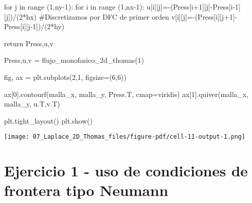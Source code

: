 \documentclass[
  letterpaper,
  DIV=11,
  numbers=noendperiod]{scrreprt}
\newenvironment{Shaded}{\begin{snugshade}}{\end{snugshade}}
\newcommand{\BuiltInTok}[1]{\textcolor[rgb]{0.00,0.23,0.31}{#1}}
\newcommand{\CommentTok}[1]{\textcolor[rgb]{0.37,0.37,0.37}{#1}}
\newcommand{\ControlFlowTok}[1]{\textcolor[rgb]{0.00,0.23,0.31}{#1}}
\newcommand{\DecValTok}[1]{\textcolor[rgb]{0.68,0.00,0.00}{#1}}
\newcommand{\KeywordTok}[1]{\textcolor[rgb]{0.00,0.23,0.31}{#1}}
\newcommand{\NormalTok}[1]{\textcolor[rgb]{0.00,0.23,0.31}{#1}}
\newcommand{\OperatorTok}[1]{\textcolor[rgb]{0.37,0.37,0.37}{#1}}
\newcommand{\StringTok}[1]{\textcolor[rgb]{0.13,0.47,0.30}{#1}}
\begin{document}
\begin{Shaded}
\begin{Highlighting}[]
    \ControlFlowTok{for}\NormalTok{ j }\KeywordTok{in} \BuiltInTok{range}\NormalTok{ (}\DecValTok{1}\NormalTok{,ny}\OperatorTok{{-}}\DecValTok{1}\NormalTok{):}
        \ControlFlowTok{for}\NormalTok{ i }\KeywordTok{in} \BuiltInTok{range}\NormalTok{ (}\DecValTok{1}\NormalTok{,nx}\OperatorTok{{-}}\DecValTok{1}\NormalTok{):}
\NormalTok{            u[i][j]}\OperatorTok{={-}}\NormalTok{(Press[i}\OperatorTok{+}\DecValTok{1}\NormalTok{][j]}\OperatorTok{{-}}\NormalTok{Press[i}\OperatorTok{{-}}\DecValTok{1}\NormalTok{][j])}\OperatorTok{/}\NormalTok{(}\DecValTok{2}\OperatorTok{*}\NormalTok{hx)  }\CommentTok{\#Discretizamos por DFC de primer orden}
\NormalTok{            v[i][j]}\OperatorTok{={-}}\NormalTok{(Press[i][j}\OperatorTok{+}\DecValTok{1}\NormalTok{]}\OperatorTok{{-}}\NormalTok{Press[i][j}\OperatorTok{{-}}\DecValTok{1}\NormalTok{])}\OperatorTok{/}\NormalTok{(}\DecValTok{2}\OperatorTok{*}\NormalTok{hy)}
    
    \ControlFlowTok{return}\NormalTok{ Press,u,v}
\end{Highlighting}
\end{Shaded}

\begin{Shaded}
\begin{Highlighting}[]
\NormalTok{Press,u,v  }\OperatorTok{=}\NormalTok{ flujo\_monofasico\_2d\_thomas(}\DecValTok{1}\NormalTok{)}
\end{Highlighting}
\end{Shaded}

\begin{Shaded}
\begin{Highlighting}[]
\NormalTok{fig, ax }\OperatorTok{=}\NormalTok{ plt.subplots(}\DecValTok{2}\NormalTok{,}\DecValTok{1}\NormalTok{, figsize}\OperatorTok{=}\NormalTok{(}\DecValTok{6}\NormalTok{,}\DecValTok{6}\NormalTok{))}

\NormalTok{ax[}\DecValTok{0}\NormalTok{].contourf(malla\_x, malla\_y, Press.T, cmap}\OperatorTok{=}\StringTok{\textquotesingle{}viridis\textquotesingle{}}\NormalTok{)}
\NormalTok{ax[}\DecValTok{1}\NormalTok{].quiver(malla\_x, malla\_y, u.T,v.T)}

\NormalTok{plt.tight\_layout()}
\NormalTok{plt.show()}
\end{Highlighting}
\end{Shaded}

\texttt{[image: 07\_Laplace\_2D\_Thomas\_files/figure-pdf/cell-11-output-1.png]}

\section{Ejercicio 1 - uso de condiciones de frontera tipo
Neumann}\label{ejercicio-1---uso-de-condiciones-de-frontera-tipo-neumann}
\end{document}
